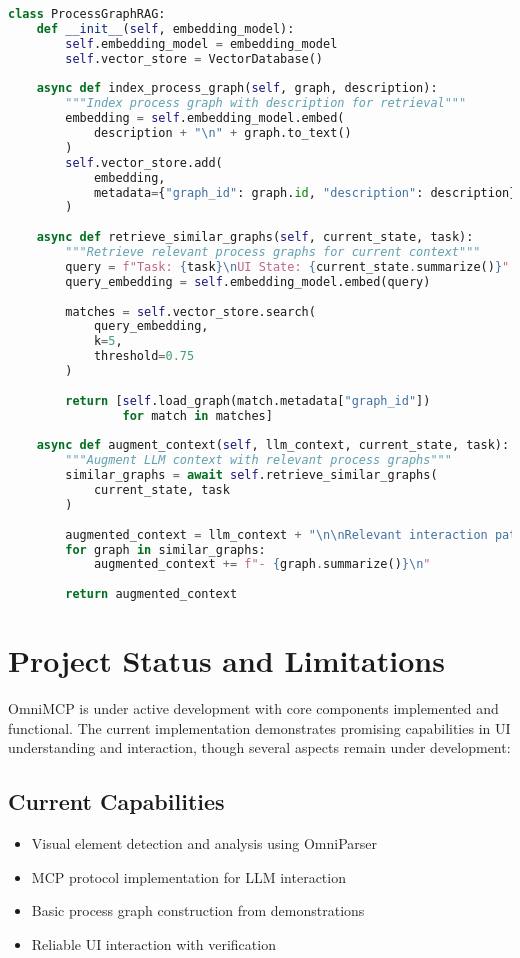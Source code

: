 \documentclass{article}
\begin{document}
\begin{lstlisting}[language=Python]
class ProcessGraphRAG:
    def __init__(self, embedding_model):
        self.embedding_model = embedding_model
        self.vector_store = VectorDatabase()
        
    async def index_process_graph(self, graph, description):
        """Index process graph with description for retrieval"""
        embedding = self.embedding_model.embed(
            description + "\n" + graph.to_text()
        )
        self.vector_store.add(
            embedding, 
            metadata={"graph_id": graph.id, "description": description}
        )
        
    async def retrieve_similar_graphs(self, current_state, task):
        """Retrieve relevant process graphs for current context"""
        query = f"Task: {task}\nUI State: {current_state.summarize()}"
        query_embedding = self.embedding_model.embed(query)
        
        matches = self.vector_store.search(
            query_embedding,
            k=5,
            threshold=0.75
        )
        
        return [self.load_graph(match.metadata["graph_id"]) 
                for match in matches]
                
    async def augment_context(self, llm_context, current_state, task):
        """Augment LLM context with relevant process graphs"""
        similar_graphs = await self.retrieve_similar_graphs(
            current_state, task
        )
        
        augmented_context = llm_context + "\n\nRelevant interaction patterns:\n"
        for graph in similar_graphs:
            augmented_context += f"- {graph.summarize()}\n"
            
        return augmented_context
\end{lstlisting}

\section{Project Status and Limitations}

OmniMCP is under active development with core components implemented and functional. The current implementation demonstrates promising capabilities in UI understanding and interaction, though several aspects remain under development:

\subsection{Current Capabilities}
\begin{itemize}
    \item Visual element detection and analysis using OmniParser
    \item MCP protocol implementation for LLM interaction
    \item Basic process graph construction from demonstrations
    \item Reliable UI interaction with verification
\end{itemize}
\end{document}
